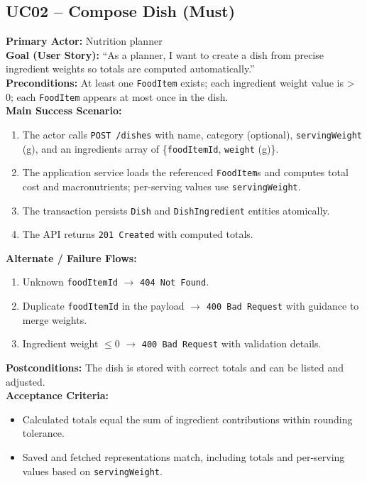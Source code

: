 \documentclass[11pt]{article}
\begin{document}
\subsection*{UC02 -- Compose Dish (Must)}
\textbf{Primary Actor:} Nutrition planner\\
\textbf{Goal (User Story):} ``As a planner, I want to create a dish from precise ingredient weights so totals are computed automatically.''\\
\textbf{Preconditions:} At least one \texttt{FoodItem} exists; each ingredient weight value is > 0; each \texttt{FoodItem} appears at most once in the dish.\\
\textbf{Main Success Scenario:}
\begin{enumerate}[label=\arabic*.]
  \item The actor calls \texttt{POST /dishes} with name, category (optional), \texttt{servingWeight} (g), and an ingredients array of \{\texttt{foodItemId}, \texttt{weight} (g)\}.
  \item The application service loads the referenced \texttt{FoodItem}s and computes total cost and macronutrients; per-serving values use \texttt{servingWeight}.
  \item The transaction persists \texttt{Dish} and \texttt{DishIngredient} entities atomically.
  \item The API returns \texttt{201 Created} with computed totals.
\end{enumerate}
\textbf{Alternate / Failure Flows:}
\begin{enumerate}[label=\arabic*F.]
  \item Unknown \texttt{foodItemId} $\rightarrow$ \texttt{404 Not Found}.
  \item Duplicate \texttt{foodItemId} in the payload $\rightarrow$ \texttt{400 Bad Request} with guidance to merge weights.
  \item Ingredient weight $\leq 0$ $\rightarrow$ \texttt{400 Bad Request} with validation details.
\end{enumerate}
\textbf{Postconditions:} The dish is stored with correct totals and can be listed and adjusted.\\
\textbf{Acceptance Criteria:}
\begin{itemize}[noitemsep]
  \item Calculated totals equal the sum of ingredient contributions within rounding tolerance.
  \item Saved and fetched representations match, including totals and per-serving values based on \texttt{servingWeight}.
\end{itemize}
\end{document}
